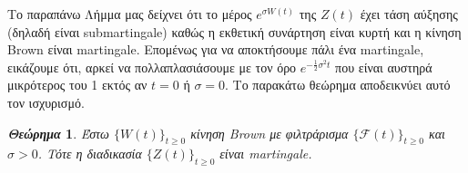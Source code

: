 \documentclass[12pt,a4paper,twoside,openany]{book}
\newtheorem{theorem}{\textit{Θεώρημα}}[section]
\begin{document}
		\noindent Το παραπάνω Λήμμα μας δείχνει ότι το μέρος $e^{\sigma W(t)}$ της $Z(t)$ έχει τάση αύξησης (δηλαδή είναι submartingale) καθώς η εκθετική συνάρτηση είναι κυρτή και η κίνηση Brown είναι martingale. Επομένως για να αποκτήσουμε πάλι ένα martingale, εικάζουμε ότι, αρκεί να πολλαπλασιάσουμε με τον όρο $e^{-\frac{1}{2}\sigma^2t}$ που είναι αυστηρά μικρότερος του 1 εκτός αν $t=0$ ή $\sigma=0$. Το παρακάτω θεώρημα αποδεικνύει αυτό τον ισχυρισμό.
	\vspace{2.5mm}
		\begin{theorem}
			Έστω $\{W(t)\}_{t\geq0}$ κίνηση Brown με φιλτράρισμα $\{\mathcal{F}(t)\}_{t\geq0}$ και $\sigma>0$. Τότε η διαδικασία $\{Ζ(t)\}_{t\geq0}$ είναι martingale.
		\end{theorem}
\end{document}
